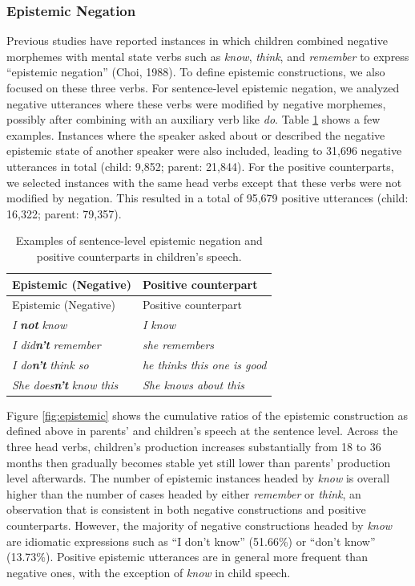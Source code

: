 \documentclass[
  man,floatsintext]{apa6}
\begin{document}
\hypertarget{epistemic-negation}{%
\subsubsection{Epistemic Negation}\label{epistemic-negation}}

Previous studies have reported instances in which children combined negative morphemes with mental state verbs such as \emph{know}, \emph{think}, and \emph{remember} to express ``epistemic negation'' (Choi, 1988). To define epistemic constructions, we also focused on these three verbs. For sentence-level epistemic negation, we analyzed negative utterances where these verbs were modified by negative morphemes, possibly after combining with an auxiliary verb like \emph{do}. Table \ref{tab:epistem} shows a few examples. Instances where the speaker asked about or described the negative epistemic state of another speaker were also included, leading to 31,696 negative utterances in total (child: 9,852; parent: 21,844). For the positive counterparts, we selected instances with the same head verbs except that these verbs were not modified by negation. This resulted in a total of 95,679 positive utterances (child: 16,322; parent: 79,357).

\begin{longtable}[]{@{}ll@{}}
\caption{\label{tab:epistem} Examples of sentence-level epistemic negation and positive counterparts in children's speech.}\tabularnewline
\toprule\noalign{}
Epistemic (Negative) & Positive counterpart \\
\midrule\noalign{}
\endfirsthead
\toprule\noalign{}
Epistemic (Negative) & Positive counterpart \\
\midrule\noalign{}
\endhead
\bottomrule\noalign{}
\endlastfoot
\emph{I} \textbf{\emph{not}} \emph{know} & \emph{I know} \\
\emph{I did\textbf{n't}} \emph{remember} & \emph{she remembers} \\
\emph{I do\textbf{n't}} \emph{think so} & \emph{he thinks this one is good} \\
\emph{She does\textbf{n't}} \emph{know this} & \emph{She knows about this} \\
\end{longtable}

Figure \ref{fig:epistemic} shows the cumulative ratios of the epistemic construction as defined above in parents' and children's speech at the sentence level. Across the three head verbs, children's production increases substantially from 18 to 36 months then gradually becomes stable yet still lower than parents' production level afterwards. The number of epistemic instances headed by \emph{know} is overall higher than the number of cases headed by either \emph{remember} or \emph{think}, an observation that is consistent in both negative constructions and positive counterparts. However, the majority of negative constructions headed by \emph{know} are idiomatic expressions such as ``I don't know'' (51.66\%) or ``don't know'' (13.73\%). Positive epistemic utterances are in general more frequent than negative ones, with the exception of \emph{know} in child speech.
\end{document}
